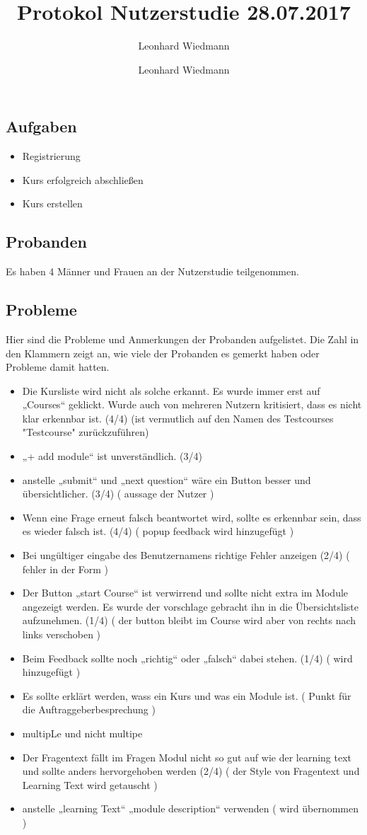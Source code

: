 \documentclass[colorback, accentcolor=tud1c, paper=a4]{tudexercise}
\title{Protokol Nutzerstudie 28.07.2017}
\subtitle{Leonhard Wiedmann}
\author{Leonhard Wiedmann}
\begin{document}
\maketitle
\subsection*{Aufgaben}
	\begin{itemize}
	\item Registrierung
  \item Kurs erfolgreich abschließen
  \item Kurs erstellen
	\end{itemize}

\subsection*{Probanden}
Es haben 4 Männer und Frauen an der Nutzerstudie teilgenommen.

\subsection*{Probleme}
  Hier sind die Probleme und Anmerkungen der Probanden aufgelistet. Die Zahl in den Klammern zeigt an, wie viele der Probanden es gemerkt haben oder Probleme damit hatten.
  \begin{itemize}
    \item Die Kursliste wird nicht als solche erkannt. Es wurde immer erst auf „Courses“ geklickt. Wurde auch von mehreren Nutzern kritisiert, dass es nicht klar erkennbar ist. (4/4) (ist vermutlich auf den Namen des Testcourses "Testcourse" zurückzuführen)
    \item „+ add module“ ist unverständlich. (3/4)
    \item anstelle „submit“ und „next question“ wäre ein Button besser und übersichtlicher. (3/4) ( aussage der Nutzer )
    \item Wenn eine Frage erneut falsch beantwortet wird, sollte es erkennbar sein, dass es wieder falsch ist. (4/4) ( popup feedback wird hinzugefügt )
    \item Bei ungültiger eingabe des Benutzernamens richtige Fehler anzeigen (2/4) ( fehler in der Form )
    \item Der Button „start Course“ ist verwirrend und sollte nicht extra im Module angezeigt werden. Es wurde der vorschlage gebracht ihn in die Übersichtsliste aufzunehmen. (1/4) ( der button bleibt im Course wird aber von rechts nach links verschoben )
    \item Beim Feedback sollte noch „richtig“ oder „falsch“ dabei stehen. (1/4) ( wird hinzugefügt )
    \item Es sollte erklärt werden, wass ein Kurs und was ein Module ist. ( Punkt für die Auftraggeberbesprechung )
    \item multipLe und nicht multipe 
    \item Der Fragentext fällt im Fragen Modul nicht so gut auf wie der learning text und sollte anders hervorgehoben werden (2/4) ( der Style von Fragentext und Learning Text wird getauscht ) 
    \item anstelle „learning Text“ „module description“ verwenden ( wird übernommen ) 
   \end{itemize}
\end{document}
